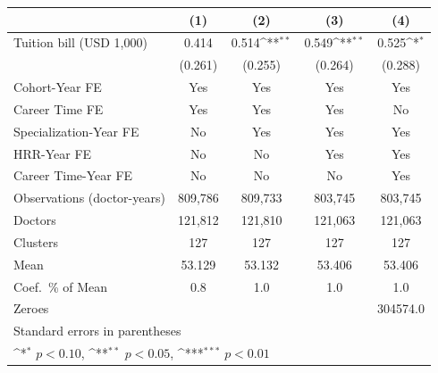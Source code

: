 {
\def\sym#1{\ifmmode^{#1}\else\(^{#1}\)\fi}
\begin{tabular}{l*{4}{c}}
\hline\hline
                    &\multicolumn{1}{c}{(1)}         &\multicolumn{1}{c}{(2)}         &\multicolumn{1}{c}{(3)}         &\multicolumn{1}{c}{(4)}         \\
\hline
Tuition bill (USD 1,000)&       0.414         &       0.514\sym{**} &       0.549\sym{**} &       0.525\sym{*}  \\
                    &     (0.261)         &     (0.255)         &     (0.264)         &     (0.288)         \\
[1em]
Cohort-Year FE      &         Yes         &         Yes         &         Yes         &         Yes         \\
[1em]
Career Time FE      &         Yes         &         Yes         &         Yes         &          No         \\
[1em]
Specialization-Year FE&          No         &         Yes         &         Yes         &         Yes         \\
[1em]
HRR-Year FE         &          No         &          No         &         Yes         &         Yes         \\
[1em]
Career Time-Year FE &          No         &          No         &          No         &         Yes         \\
\hline
Observations (doctor-years)&     809,786         &     809,733         &     803,745         &     803,745         \\
Doctors             &     121,812         &     121,810         &     121,063         &     121,063         \\
Clusters            &         127         &         127         &         127         &         127         \\
Mean                &      53.129         &      53.132         &      53.406         &      53.406         \\
Coef.\ \% of Mean   &         0.8         &         1.0         &         1.0         &         1.0         \\
Zeroes              &                     &                     &                     &    304574.0         \\
\hline\hline
\multicolumn{5}{l}{\footnotesize Standard errors in parentheses}\\
\multicolumn{5}{l}{\footnotesize \sym{*} \(p<0.10\), \sym{**} \(p<0.05\), \sym{***} \(p<0.01\)}\\
\end{tabular}
}
